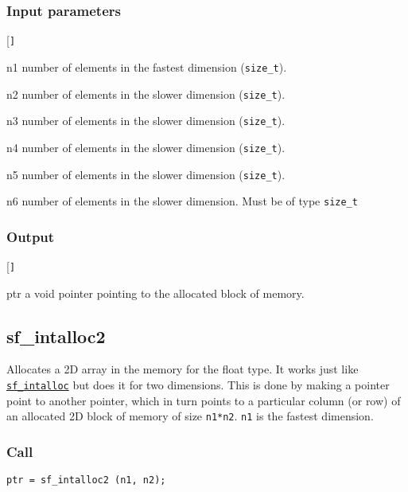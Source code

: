 \subsubsection*{Input parameters}
\begin{desclist}{\tt }{\quad}[\tt ]
   \setlength\itemsep{0pt}
   \item[n1] number of elements in the fastest dimension (\texttt{size\_t}).
   \item[n2] number of elements in the slower dimension (\texttt{size\_t}).
   \item[n3] number of elements in the slower dimension (\texttt{size\_t}).
   \item[n4] number of elements in the slower dimension (\texttt{size\_t}).
   \item[n5] number of elements in the slower dimension (\texttt{size\_t}).
   \item[n6] number of elements in the slower dimension. Must be of type \texttt{size\_t}
\end{desclist}

\subsubsection*{Output}
\begin{desclist}{\tt }{\quad}[\tt ]
   \setlength\itemsep{0pt}
   \item[ptr] a void pointer pointing to the allocated block of memory.
\end{desclist}




\subsection{{sf\_intalloc2}}\label{sec:sf_intalloc2}
Allocates a 2D array in the memory for the float type. It works just like \hyperref[sec:sf_intalloc]{\texttt{sf\_intalloc}} but does it for two dimensions. This is done by making a pointer point to another pointer, which in turn points to a particular column (or row) of an allocated 2D block of memory of size \texttt{n1*n2}. \texttt{n1} is the fastest dimension.


\subsubsection*{Call}
\begin{verbatim}ptr = sf_intalloc2 (n1, n2);\end{verbatim}

